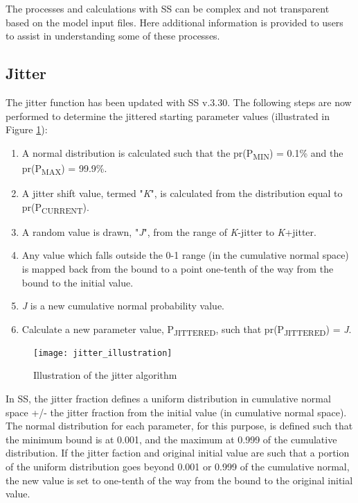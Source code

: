 The processes and calculations with SS can be complex and not transparent based on the model input files. Here additional information is provided to users to assist in understanding some of these processes.

\subsection{Jitter}
\hypertarget{Jitter}{}
The jitter function has been updated with SS v.3.30.  The following steps are now performed to determine the jittered starting parameter values (illustrated in Figure \ref{fig:jitter}):
\begin{enumerate}
	\item A normal distribution is calculated such that the pr(P\textsubscript{MIN}) = 0.1\% and the pr(P\textsubscript{MAX}) = 99.9\%.
	\item A jitter shift value, termed "\textit{K}", is calculated from the distribution equal to pr(P\textsubscript{CURRENT}).
	\item A random value is drawn, "\textit{J}", from the range of \textit{K}-jitter to \textit{K}+jitter.
	\item Any value which falls outside the 0-1 range (in the cumulative normal space) is mapped back from the bound to a point one-tenth of the way from the bound to the initial value.
	\item \textit{J} is a new cumulative normal probability value.
	\item Calculate a new parameter value, P\textsubscript{JITTERED}, such that pr(P\textsubscript{JITTERED}) = \textit{J}.
\end{enumerate}

\begin{figure}[h]
	\begin{center}
		\texttt{[image: jitter\_illustration]}\\
		\caption{Illustration of the jitter algorithm}
		\label{fig:jitter}
	\end{center}
\end{figure}

In SS, the jitter fraction defines a uniform distribution in cumulative normal space +/- the jitter fraction from the initial value (in cumulative normal space). The normal distribution for each parameter, for this purpose, is defined such that the minimum bound is at 0.001, and the maximum at 0.999 of the cumulative distribution. If the jitter faction and original initial value are such that a portion of the uniform distribution goes beyond 0.001 or 0.999 of the cumulative normal, the new value is set to one-tenth of the way from the bound to the original initial value. 

